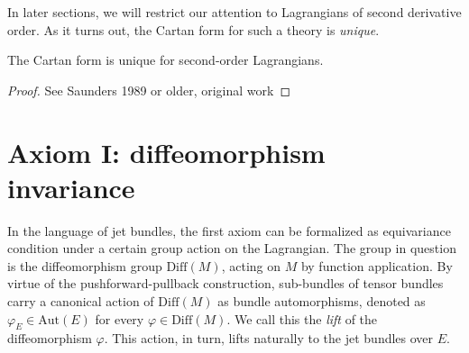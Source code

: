 In later sections, we will restrict our attention to Lagrangians of second derivative order. As it turns out, the Cartan form for such a theory is \emph{unique}.
\begin{proposition}\label{prop_cartan_unique}
  The Cartan form is unique for second-order Lagrangians.
\end{proposition}
\begin{proof}
  See Saunders 1989 or older, original work
\end{proof}

\section{Axiom I: diffeomorphism invariance}

In the language of jet bundles, the first axiom can be formalized as equivariance condition under a certain group action on the Lagrangian. The group in question is the diffeomorphism group $\mathrm{Diff}(M)$, acting on $M$ by function application. By virtue of the pushforward-pullback construction, sub-bundles of tensor bundles carry a canonical action of $\mathrm{Diff}(M)$ as bundle automorphisms, denoted as $\varphi_E\in \mathrm{Aut}(E)$ for every $\varphi\in\mathrm{Diff}(M)$. We call this the \emph{lift} of the diffeomorphism $\varphi$. This action, in turn, lifts naturally to the jet bundles over $E$.

